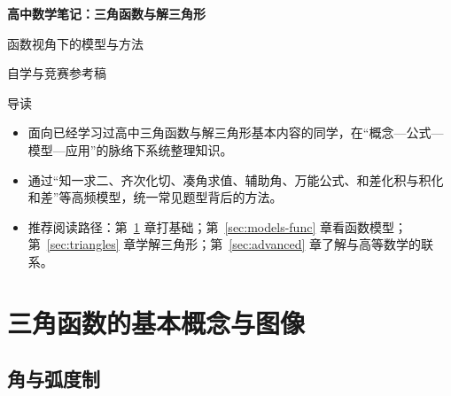 \documentclass[a4paper,11pt]{ctexart}
\renewcommand{\notetitle}{高中数学笔记：三角函数与解三角形}
\renewcommand{\noteauthor}{自学与竞赛参考稿}
\renewcommand{\notesubtitle}{函数视角下的模型与方法}
\begin{document}
\thispagestyle{empty}

\setcounter{page}{1}

\noindent
\begin{minipage}[t][0.7\textheight][c]{\textwidth}
  \raggedleft
  \vspace*{\fill}
  {\sffamily\bfseries\Huge\color{accent}\notetitle\par}
  \vspace{0.6em}
  {\Large\color{inkgray}\notesubtitle\par}
  \vspace{0.5em}
  {\large\color{inkgray}\noteauthor\par}
  \vspace{0.4em}
  \MathNoteVersionBlock
  \vspace*{\fill}
\end{minipage}

\begin{center}
\begin{minipage}{0.82\textwidth}
\textcolor{inkgray}{\sffamily\small 导读}\\
\begin{itemize}
  \item 面向已经学习过高中三角函数与解三角形基本内容的同学，在“概念—公式—模型—应用”的脉络下系统整理知识。
  \item 通过“知一求二、齐次化切、凑角求值、辅助角、万能公式、和差化积与积化和差”等高频模型，统一常见题型背后的方法。
  \item 推荐阅读路径：第~\ref{sec:basic} 章打基础；第~\ref{sec:models-func} 章看函数模型；第~\ref{sec:triangles} 章学解三角形；第~\ref{sec:advanced} 章了解与高等数学的联系。
\end{itemize}
\end{minipage}
\end{center}
\vspace{1em}

\clearpage
\thispagestyle{plain}
\tableofcontents

\clearpage

\section{三角函数的基本概念与图像}
\label{sec:basic}

\subsection{角与弧度制}
\end{document}
